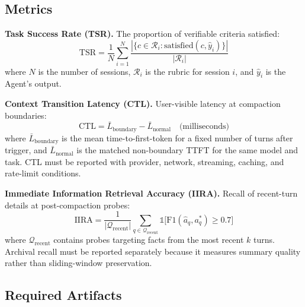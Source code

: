 \documentclass[10pt,twocolumn]{article}
\begin{document}
\subsection{Metrics}\label{sec:metrics}

\textbf{Task Success Rate (TSR).} The proportion of verifiable criteria satisfied:
\begin{equation}\label{eq:tsr}
  \text{TSR} = \frac{1}{N} \sum_{i=1}^{N} \frac{|\{c \in \mathcal{R}_i : \text{satisfied}(c, \hat{y}_i)\}|}{|\mathcal{R}_i|}
\end{equation}
where $N$ is the number of sessions, $\mathcal{R}_i$ is the rubric for session $i$, and $\hat{y}_i$ is the Agent's output.

\textbf{Context Transition Latency (CTL).} User-visible latency at compaction boundaries:
\begin{equation}\label{eq:ctl}
  \text{CTL} = \bar{L}_{\text{boundary}} - \bar{L}_{\text{normal}} \quad \text{(milliseconds)}
\end{equation}
where $\bar{L}_{\text{boundary}}$ is the mean time-to-first-token for a fixed number of turns after trigger, and $\bar{L}_{\text{normal}}$ is the matched non-boundary TTFT for the same model and task. CTL must be reported with provider, network, streaming, caching, and rate-limit conditions.

\textbf{Immediate Information Retrieval Accuracy (IIRA).} Recall of recent-turn details at post-compaction probes:
\begin{equation}\label{eq:iira}
  \text{IIRA} = \frac{1}{|\mathcal{Q}_{\mathrm{recent}}|} \sum_{q \in \mathcal{Q}_{\mathrm{recent}}} \mathbb{1}\bigl[\text{F1}(\hat{a}_q, a_q^{*}) \geq 0.7\bigr]
\end{equation}
where $\mathcal{Q}_{\mathrm{recent}}$ contains probes targeting facts from the most recent $k$ turns. Archival recall must be reported separately because it measures summary quality rather than sliding-window preservation.

\subsection{Required Artifacts}
\end{document}
